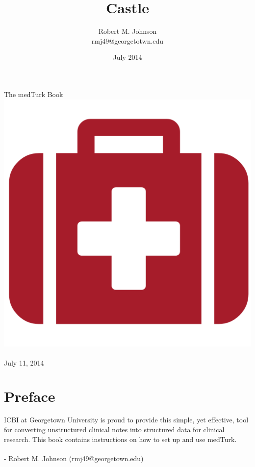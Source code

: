 \documentclass{book}
\begin{document}
\author{Robert M. Johnson \\ rmj49@georgetotwn.edu}
\title{Castle}
\date{July 2014}



\begin{titlepage}
\begin{center}

{\fontsize{50}{150}\selectfont The medTurk Book}
\includegraphics[scale=0.7]{../ui/img/medkit.png}~  \\[1cm]
July 11, 2014
\end{center}
\end{titlepage}


\frontmatter


\chapter*{Preface}
ICBI at Georgetown University is proud to provide this simple, yet effective, tool for converting unstructured clinical notes into structured data for clinical research. This book contains instructions on how to set up and use medTurk.
\\
\\
- Robert M. Johnson (rmj49@georgetown.edu)
\end{document}
